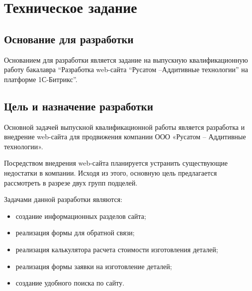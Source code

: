 \newpage
\section{Техническое задание}
\subsection{Основание для разработки}

Основанием для разработки является задание на выпускную квалификационную работу бакалавра ``Разработка web-сайта ``Русатом –Аддитивные технологии'' на платформе 1С-Битрикс''.

\subsection{Цель и назначение разработки}

Основной задачей выпускной квалификационной работы является разработка и внедрение web-сайта для продвижения компании ООО «Русатом – Аддитивные технологии».

Посредством внедрения web-сайта планируется устранить существующие недостатки в компании. Исходя из этого, основную цель предлагается рассмотреть в разрезе двух групп подцелей.

Задачами данной разработки являются:
\begin{itemize}
\item создание информационных разделов сайта;
\item    реализация формы для обратной связи;
\item реализация калькулятора расчета стоимости изготовления деталей;
\item реализация формы заявки на изготовление деталей;
\item создание удобного поиска по сайту.
\end{itemize}
